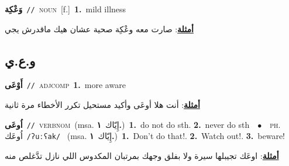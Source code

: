 \documentclass[10pt,a4paper,twoside]{article} %
\begin{document}
\begin{multicols}{2}
{\setlength\topsep{0pt}\textbf{\foreignlanguage{arabic}{وَعْكِة}}\ {\color{gray}\texttt{//}\color{black}}\ \textsc{noun}\ [f.]\ \textbf{1.}~mild illness\  \begin{flushright}\color{gray}\foreignlanguage{arabic}{\textbf{\underline{\foreignlanguage{arabic}{أمثلة}}}: صارت معه وعْكِة صحية عشان هيك ماقدرش يجي}\end{flushright}\color{black}} \vspace{2mm}

\vspace{-3mm}
\subsection*{\color{blue}\foreignlanguage{arabic}{و.ع.ي}\color{blue}{}} 

{\setlength\topsep{0pt}\textbf{\foreignlanguage{arabic}{أَوْعَى}}\ {\color{gray}\texttt{//}\color{black}}\ \textsc{adj\textunderscore comp}\ \textbf{1.}~more aware\  \begin{flushright}\color{gray}\foreignlanguage{arabic}{\textbf{\underline{\foreignlanguage{arabic}{أمثلة}}}: أنت هلا أوعَى وأكيد مستحيل تكرر الأخطاء مرة ثانية}\end{flushright}\color{black}} \vspace{2mm}

{\setlength\topsep{0pt}\textbf{\foreignlanguage{arabic}{اُوعَى}}\ {\color{gray}\texttt{//}\color{black}}\ \textsc{verb\textunderscore nom}\ \color{gray}(msa. \foreignlanguage{arabic}{إِيّاك}~\foreignlanguage{arabic}{\textbf{١.}})\color{black}\ \textbf{1.}~do not do sth.  \textbf{2.}~never do sth\ \ $\bullet$\ \ \textsc{ph.} \color{gray} \foreignlanguage{arabic}{اُوعَك}\color{black}\ {\color{gray}\texttt{/{\sffamily ʔuːʕak}/}\color{black}}\ \color{gray} (msa. \foreignlanguage{arabic}{إِيّاك}~\foreignlanguage{arabic}{\textbf{١.}})\color{black}\ \textbf{1.}~Don't do that!.  \textbf{2.}~Watch out!.  \textbf{3.}~beware!\  \begin{flushright}\color{gray}\foreignlanguage{arabic}{\textbf{\underline{\foreignlanguage{arabic}{أمثلة}}}: اوعَك تجيبلها سيرة ولا بفلق وجهك بمرتبان المكدوس اللي نازل تدَّغلص منه}\end{flushright}\color{black}} \vspace{2mm}


\end{multicols}
\end{document}
